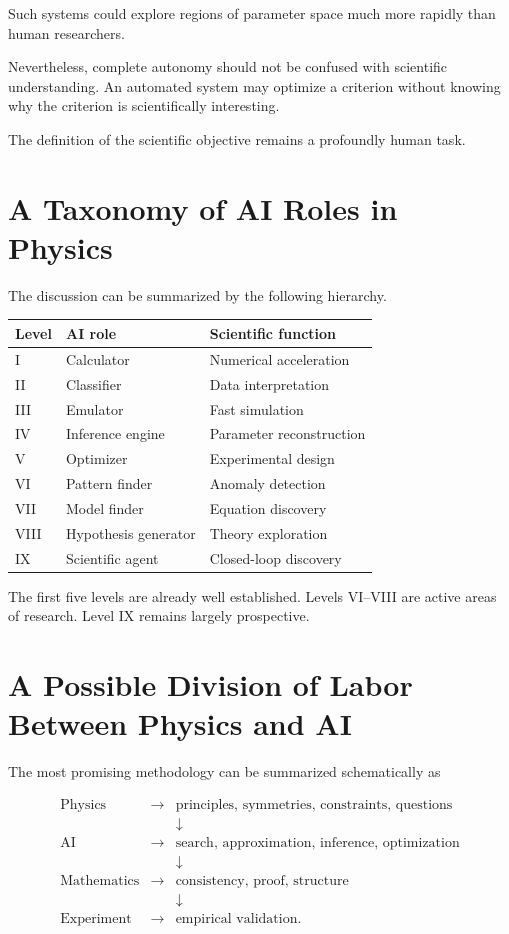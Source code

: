 \documentclass[11pt,a4paper]{article}
\begin{document}
Such systems could explore regions of parameter space much more rapidly than
human researchers.

Nevertheless, complete autonomy should not be confused with scientific
understanding. An automated system may optimize a criterion without knowing why
the criterion is scientifically interesting.

The definition of the scientific objective remains a profoundly human task.

\section{A Taxonomy of AI Roles in Physics}

The discussion can be summarized by the following hierarchy.

\begin{center}
\begin{tabular}{lll}
\toprule
Level & AI role & Scientific function\\
\midrule
I & Calculator & Numerical acceleration\\
II & Classifier & Data interpretation\\
III & Emulator & Fast simulation\\
IV & Inference engine & Parameter reconstruction\\
V & Optimizer & Experimental design\\
VI & Pattern finder & Anomaly detection\\
VII & Model finder & Equation discovery\\
VIII & Hypothesis generator & Theory exploration\\
IX & Scientific agent & Closed-loop discovery\\
\bottomrule
\end{tabular}
\end{center}

The first five levels are already well established. Levels VI--VIII are active
areas of research. Level IX remains largely prospective.

\section{A Possible Division of Labor Between Physics and AI}

The most promising methodology can be summarized schematically as

\begin{equation}
\boxed{
\begin{array}{rcl}
\text{Physics} &\longrightarrow&
\text{principles, symmetries, constraints, questions}\\
&&\downarrow\\
\text{AI} &\longrightarrow&
\text{search, approximation, inference, optimization}\\
&&\downarrow\\
\text{Mathematics} &\longrightarrow&
\text{consistency, proof, structure}\\
&&\downarrow\\
\text{Experiment} &\longrightarrow&
\text{empirical validation}.
\end{array}}
\end{equation}
\end{document}
